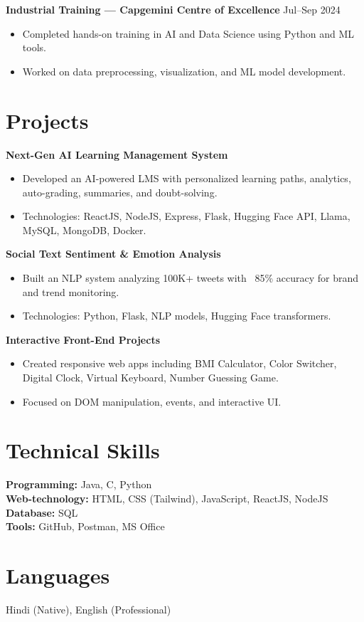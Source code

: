 \documentclass[11pt,a4paper]{article}
\begin{document}
\textbf{Industrial Training — Capgemini Centre of Excellence} \hfill Jul–Sep 2024 \\
\begin{itemize}
    \item Completed hands-on training in AI and Data Science using Python and ML tools.
    \item Worked on data preprocessing, visualization, and ML model development.
\end{itemize}

\section*{Projects}

\textbf{Next-Gen AI Learning Management System}
\begin{itemize}
    \item Developed an AI-powered LMS with personalized learning paths, analytics, auto-grading, summaries, and doubt-solving.
    \item Technologies: ReactJS, NodeJS, Express, Flask, Hugging Face API, Llama, MySQL, MongoDB, Docker.
\end{itemize}

\textbf{Social Text Sentiment \& Emotion Analysis}
\begin{itemize}
    \item Built an NLP system analyzing 100K+ tweets with ~85\% accuracy for brand and trend monitoring.
    \item Technologies: Python, Flask, NLP models, Hugging Face transformers.
\end{itemize}

\textbf{Interactive Front-End Projects}
\begin{itemize}
    \item Created responsive web apps including BMI Calculator, Color Switcher, Digital Clock, Virtual Keyboard, Number Guessing Game.
    \item Focused on DOM manipulation, events, and interactive UI.
\end{itemize}

\section*{Technical Skills}
\textbf{Programming:} Java, C, Python \\
\textbf{Web-technology:} HTML, CSS (Tailwind), JavaScript, ReactJS, NodeJS \\
\textbf{Database:} SQL \\
\textbf{Tools:} GitHub, Postman, MS Office
\section*{Languages}
Hindi (Native), English (Professional)
\end{document}
